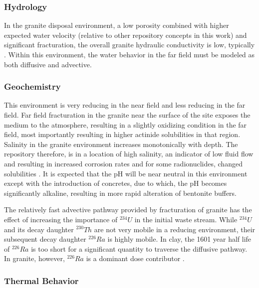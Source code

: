 \subsubsection{Hydrology}

In the granite disposal environment, a low porosity combined with 
higher expected water velocity (relative to other repository concepts in this 
work) and significant fracturation, the overall 
granite hydraulic conductivity is low, typically
\cite{schwartz_fundamentals_2004, 
hardin_generic_2011}. Within this environment, the  
water behavior in the far field must be modeled as both diffusive and advective.

\subsubsection{Geochemistry}

This environment is very reducing in the near field and less reducing in the 
far field. Far field fracturation in the granite near the surface of the site 
exposes the medium to the atmosphere, resulting in a slightly oxidizing 
condition in the far field, most importantly resulting in higher actinide 
solubilities in that region. Salinity in the granite environment increases 
monotonically with depth. The repository therefore, is in a location of high 
salinity, an indicator of low fluid flow and resulting in increased corrosion 
rates and for some radionuclides, changed solubilities \cite{argile_granite:_2005}.
It is expected that the pH will be near neutral in this environment except with  
the introduction of concretes, due to which, the pH becomes significantly 
alkaline, resulting in more rapid alteration of bentonite buffers. 

The relatively fast advective pathway provided by fracturation of granite 
has the effect of increasing the importance of $^{234}U$ in the initial waste 
stream. While $^{234}U$ and its decay daughter $^{230}Th$ are not very mobile 
in a reducing environment, their subsequent decay daughter $^{226}Ra$ is highly 
mobile. In clay, the 1601 year half life of $^{226}Ra$ is too short for a 
significant quantity to traverse the diffusive pathway. In granite, however,  
$^{226}Ra$ is a dominant dose contributor \cite{swift_applying_2010}. 

\subsubsection{Thermal Behavior}
\label{subsec:granitethermal}


